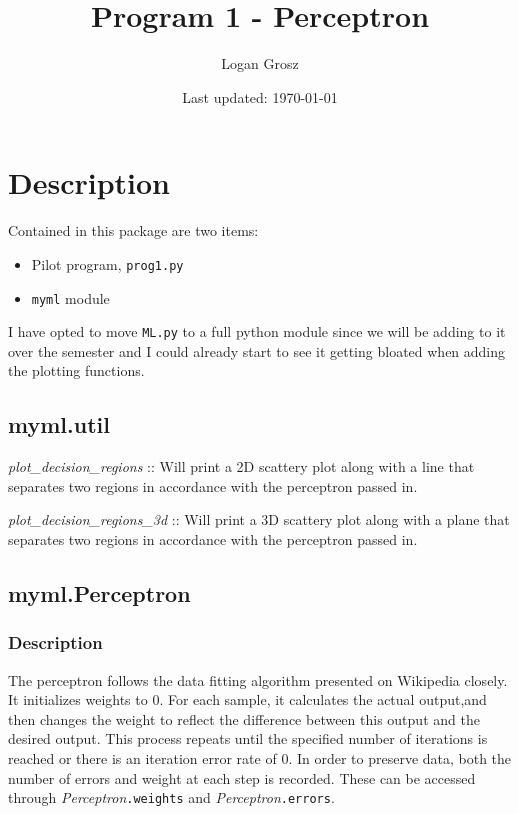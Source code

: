 \documentclass{article}
\title{Program 1 - Perceptron}
\author{Logan Grosz}
\date{Last updated: \today}
\begin{document}
\maketitle

\section{Description}

Contained in this package are two items:

\begin{itemize}
    \item Pilot program, \texttt{prog1.py}    
    \item \texttt{myml} module
\end{itemize}

I have opted to move \texttt{ML.py} to a full python module since we will be
adding to it over the semester and I could already start to see it getting
bloated when adding the plotting functions.

\subsection{myml.util}

\textit{plot\_decision\_regions} :: Will print a 2D scattery plot along with a
line that separates two regions in accordance with the perceptron passed in.

\textit{plot\_decision\_regions\_3d} :: Will print a 3D scattery plot along with a
plane that separates two regions in accordance with the perceptron passed in.

\subsection{myml.Perceptron}

\subsubsection{Description}

The perceptron follows the data fitting algorithm presented on Wikipedia
closely. It initializes weights to 0. For each sample, it calculates the actual
output,and then changes the weight to reflect the difference between this output
and the desired output. This process repeats until the specified number of
iterations is reached or there is an iteration error rate of 0. In order to
preserve data, both the number of errors and weight at each step is recorded.
These can be accessed through \textit{Perceptron}\texttt{.weights} and
\textit{Perceptron}\texttt{.errors}.
\end{document}
